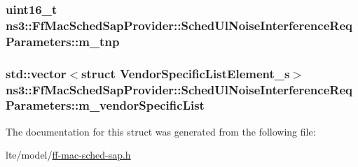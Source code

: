 \subsubsection[{\texorpdfstring{m\+\_\+tnp}{m_tnp}}]{\setlength{\rightskip}{0pt plus 5cm}uint16\+\_\+t ns3\+::\+Ff\+Mac\+Sched\+Sap\+Provider\+::\+Sched\+Ul\+Noise\+Interference\+Req\+Parameters\+::m\+\_\+tnp}\hypertarget{structns3_1_1FfMacSchedSapProvider_1_1SchedUlNoiseInterferenceReqParameters_a053bbc38b5f827580e12d7c370fe65ee}{}\label{structns3_1_1FfMacSchedSapProvider_1_1SchedUlNoiseInterferenceReqParameters_a053bbc38b5f827580e12d7c370fe65ee}
\subsubsection[{\texorpdfstring{m\+\_\+vendor\+Specific\+List}{m_vendorSpecificList}}]{\setlength{\rightskip}{0pt plus 5cm}std\+::vector$<$struct {\bf Vendor\+Specific\+List\+Element\+\_\+s}$>$ ns3\+::\+Ff\+Mac\+Sched\+Sap\+Provider\+::\+Sched\+Ul\+Noise\+Interference\+Req\+Parameters\+::m\+\_\+vendor\+Specific\+List}\hypertarget{structns3_1_1FfMacSchedSapProvider_1_1SchedUlNoiseInterferenceReqParameters_a103541df10fdc0008f8ddce66f25111a}{}\label{structns3_1_1FfMacSchedSapProvider_1_1SchedUlNoiseInterferenceReqParameters_a103541df10fdc0008f8ddce66f25111a}


The documentation for this struct was generated from the following file\+:\begin{DoxyCompactItemize}
\item 
lte/model/\hyperlink{ff-mac-sched-sap_8h}{ff-\/mac-\/sched-\/sap.\+h}\end{DoxyCompactItemize}
